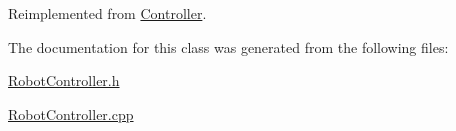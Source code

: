 Reimplemented from \mbox{\hyperlink{class_controller_a8cb970ef732138c921434796ad66a75c}{Controller}}.



The documentation for this class was generated from the following files\+:\begin{DoxyCompactItemize}
\item 
\mbox{\hyperlink{_robot_controller_8h}{Robot\+Controller.\+h}}\item 
\mbox{\hyperlink{_robot_controller_8cpp}{Robot\+Controller.\+cpp}}\end{DoxyCompactItemize}

